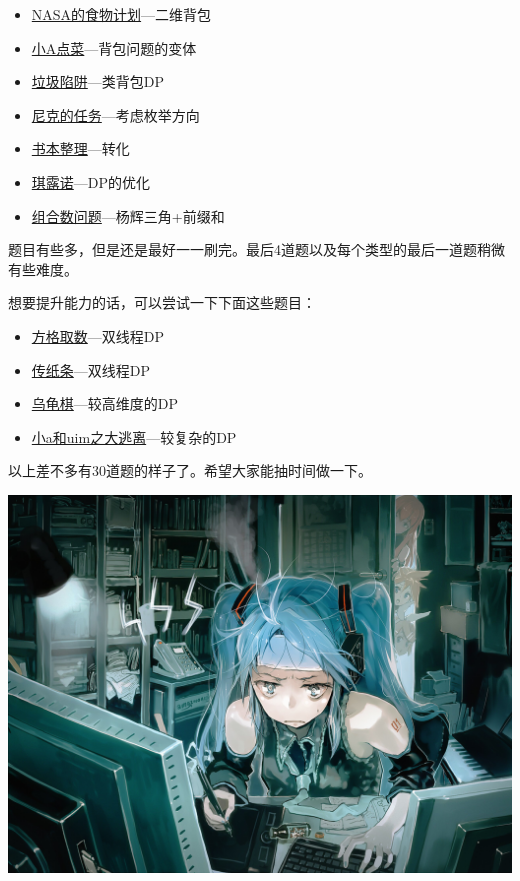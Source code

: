\documentclass{article}
\theoremstyle{nonumberplain}
\begin{document}
\begin{itemize}
		\item{\href{https://www.luogu.org/problem/show?pid=1507}{NASA的食物计划}---二维背包}
		\item{\href{https://www.luogu.org/problem/show?pid=1164}{小A点菜}---背包问题的变体}
		\item{\href{https://www.luogu.org/problem/show?pid=1156}{垃圾陷阱}---类背包DP}
		\item{\href{https://www.luogu.org/problem/show?pid=1280}{尼克的任务}---考虑枚举方向}
		\item{\href{https://www.luogu.org/problem/show?pid=1103}{书本整理}---转化}
		\item{\href{https://www.luogu.org/problem/show?pid=1725}{琪露诺}---DP的优化}
		\item{\href{https://www.luogu.org/problem/show?pid=2822}{组合数问题}---杨辉三角+前缀和}
	\end{itemize}

	题目有些多，但是还是最好一一刷完。最后4道题以及每个类型的最后一道题稍微有些难度。

	想要提升能力的话，可以尝试一下下面这些题目：
	\begin{itemize}
		\item{\href{https://www.luogu.org/problem/show?pid=1004}{方格取数}---双线程DP}
		\item{\href{https://www.luogu.org/problem/show?pid=1006}{传纸条}---双线程DP}
		\item{\href{https://www.luogu.org/problem/show?pid=1541}{乌龟棋}---较高维度的DP}
		\item{\href{https://www.luogu.org/problem/show?pid=1373}{小a和uim之大逃离}---较复杂的DP}
	\end{itemize}

	以上差不多有30道题的样子了。希望大家能抽时间做一下。

	\begin{center}\includegraphics[scale=0.25]{33237093_p0.jpg}\end{center}
\end{document}

